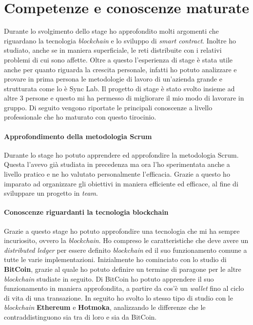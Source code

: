 
\section{Competenze e conoscenze maturate}
Durante lo svolgimento dello stage ho approfondito molti argomenti che riguardano la tecnologia \textit{blockchain} e lo sviluppo di \textit{smart contract}. Inoltre ho studiato, anche se in maniera superficiale, le reti distribuite con i relativi problemi di cui sono affette.
Oltre a questo l'esperienza di stage è stata utile anche per quanto riguarda la crescita personale, infatti ho potuto analizzare e provare in prima persona le metodologie di lavoro di un'azienda grande e strutturata come lo è Sync Lab. Il progetto di stage è stato svolto insieme ad altre 3 persone e questo mi ha permesso di migliorare il mio modo di lavorare in gruppo. 
Di seguito vengono riportate le principali conoscenze a livello professionale che ho maturato con questo tirocinio. 

\paragraph{Approfondimento della metodologia Scrum}
Durante lo stage ho potuto apprendere ed approfondire la metodologia Scrum. Questa l'avevo già studiata in precedenza ma ora l'ho sperimentata anche a livello pratico e ne ho valutato personalmente l'efficacia. Grazie a questo ho imparato ad organizzare gli obiettivi in maniera efficiente ed efficace, al fine di sviluppare un progetto in \textit{team}.

\paragraph{Conoscenze riguardanti la tecnologia blockchain} 
Grazie a questo stage ho potuto approfondire una tecnologia che mi ha sempre incuriosito, ovvero la \textit{blockchain}. Ho compreso le caratteristiche che deve avere un \textit{distributed ledger} per essere definito \textit{blockchain} ed il suo funzionamento comune a tutte le varie implementazioni. 
Inizialmente ho cominciato con lo studio di \textbf{BitCoin}, grazie al quale ho potuto definire un termine di paragone per le altre \textit{blockchain} studiate in seguito. Di BitCoin ho potuto apprendere il suo funzionamento in maniera approfondita, a partire da cos'è un \textit{wallet} fino al ciclo di vita di una transazione. In seguito ho svolto lo stesso tipo di studio con le \textit{blockchain} \textbf{Ethereum} e \textbf{Hotmoka}, analizzando le differenze che le contraddistinguono sia tra di loro e sia da BitCoin. \\

